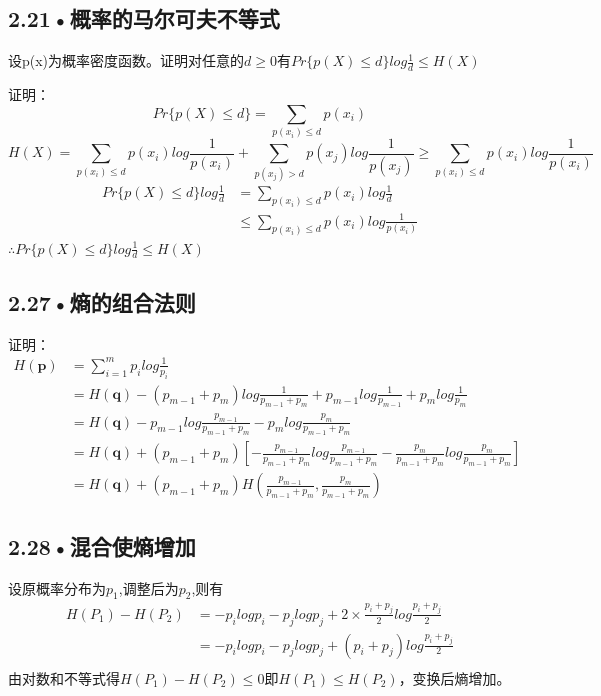 \documentclass[UTF8]{ctexart}
\begin{document}
\subsection*{2.21•概率的马尔可夫不等式}
设p(x)为概率密度函数。证明对任意的$d\geqslant 0$有$Pr\{p(X)\leqslant d\}log\frac{1}{d}\leqslant H(X)$

证明：
\begin{displaymath}
Pr\{p(X)\leqslant d\} = \sum_{p(x_i)\leqslant d}p(x_i)
\end{displaymath}
\begin{displaymath}
H(X)= \sum_{p(x_i)\leqslant d}p(x_i)log\frac{1}{p(x_i)}+ \sum_{p(x_j)> d}p(x_j)log\frac{1}{p(x_j)}\geqslant \sum_{p(x_i)\leqslant d}p(x_i)log\frac{1}{p(x_i)}
\end{displaymath}
\begin{equation*}
\begin{split}
Pr\{p(X)\leqslant d\}log\frac{1}{d}&=\sum_{p(x_i)\leqslant d}p(x_i)log\frac{1}{d}\\
&\leqslant\sum_{p(x_i)\leqslant d}p(x_i)log\frac{1}{p(x_i)}
\end{split}
\end{equation*}
$\therefore Pr\{p(X)\leqslant d\}log\frac{1}{d}\leqslant H(X)$
\subsection*{2.27•熵的组合法则}
证明：
\begin{equation*}
\begin{split}
H(\textbf{p})&=\sum _{i=1}^{m}p_ilog\frac{1}{p_i}\\
&=H(\textbf{q})-(p_{m-1}+p_m)log\frac{1}{p_{m-1}+p_m}+p_{m-1}log\frac{1}{p_{m-1}}+p_mlog\frac{1}{p_m}\\
&=H(\textbf{q})-p_{m-1}log\frac{p_{m-1}}{p_{m-1}+p_m}-p_mlog\frac{p_m}{p_{m-1}+p_m}\\
&=H(\textbf{q})+(p_{m-1}+p_m)[-\frac{p_{m-1}}{p_{m-1}+p_m}log\frac{p_{m-1}}{p_{m-1}+p_m}-\frac{p_{m}}{p_{m-1}+p_m}log\frac{p_m}{p_{m-1}+p_m}]\\
&=H(\textbf{q})+(p_{m-1}+p_m)H(\frac{p_{m-1}}{p_{m-1}+p_m},\frac{p_m}{p_{m-1}+p_m})
\end{split}
\end{equation*}

\subsection*{2.28•混合使熵增加}

设原概率分布为\textbf{$p_1$},调整后为\textbf{$p_2$},则有
\begin{equation*}
\begin{split}
H(P_1)-H(P_2)&=-p_ilogp_i-p_jlogp_j+2\times \frac{p_i+p_j}{2}log\frac{p_i+p_j}{2}\\
&=-p_ilogp_i-p_jlogp_j+(p_i+p_j)log\frac{p_i+p_j}{2}\\
\end{split}
\end{equation*}
由对数和不等式得$H(P_1)-H(P_2)\leqslant 0$即$H(P_1)\leqslant H(P_2)$，变换后熵增加。
\end{document}
